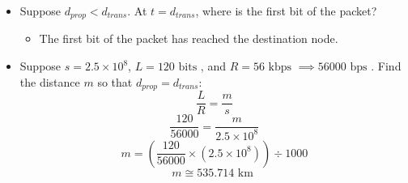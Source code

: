 \documentclass{article}
\begin{document}
\begin{enumerate}
\begin{itemize}
\item Suppose $d_{prop} < d_{trans}$. At $t = d_{trans}$, where is the first bit of the packet?
\begin{itemize}
\item The first bit of the packet has reached the destination node.  
\end{itemize}

\item Suppose $s = 2.5 \times 10^{8}$, $L = 120 \text{ bits }$, and $R = 56 \text{ kbps } \implies 56000 \text{ bps }$. Find the distance $m$ so that $d_{prop} = d_{trans}:$
$$ \frac{L}{R} = \frac{m}{s}$$
$$ \frac{120}{56000} = \frac{m}{2.5 \times 10^{8}}$$
$$m = (\frac{120}{56000} \times (2.5 \times 10^{8})) \div 1000$$
$$m \cong 535.714 \text{ km }$$
\end{itemize}


\end{enumerate}
\end{document}
